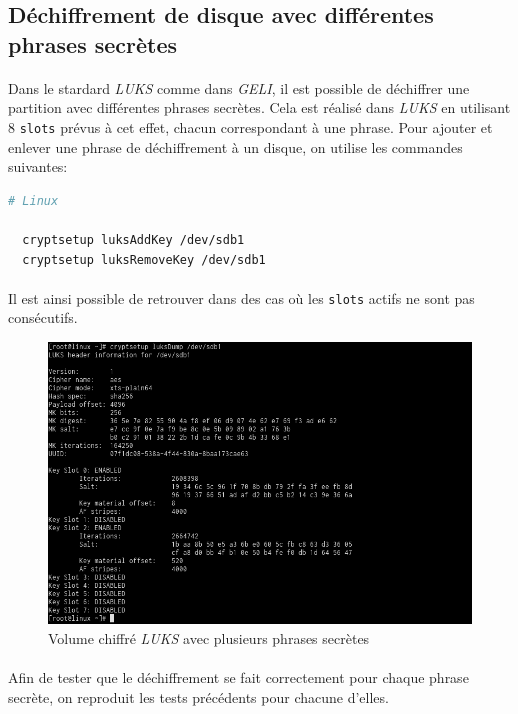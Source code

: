 \subsection{Déchiffrement de disque avec différentes phrases secrètes}
\paragraph{}
Dans le stardard \textit{LUKS} comme dans \textit{GELI}, il est possible de
déchiffrer une partition avec différentes phrases secrètes. Cela est réalisé dans
\textit{LUKS} en utilisant 8 \texttt{slots} prévus à cet effet, chacun
correspondant à une phrase. Pour ajouter et enlever une phrase de déchiffrement
à un disque, on utilise les commandes suivantes:
\\
\begin{lstlisting}[language=bash]
  # Linux

  cryptsetup luksAddKey /dev/sdb1
  cryptsetup luksRemoveKey /dev/sdb1
\end{lstlisting}
\paragraph{}
Il est ainsi possible de retrouver dans des cas où les \texttt{slots} actifs ne
sont pas consécutifs.
\begin{figure}[H]
  \centering
  \includegraphics[width=\linewidth]{tests/linux_multiple_passphrases.png}
  \caption{\label{fig:linux_multiple_passphrases}Volume chiffré \textit{LUKS}
    avec plusieurs phrases secrètes}
\end{figure}
\paragraph{}
Afin de tester que le déchiffrement se fait correctement pour chaque phrase
secrète, on reproduit les tests précédents pour chacune d'elles.